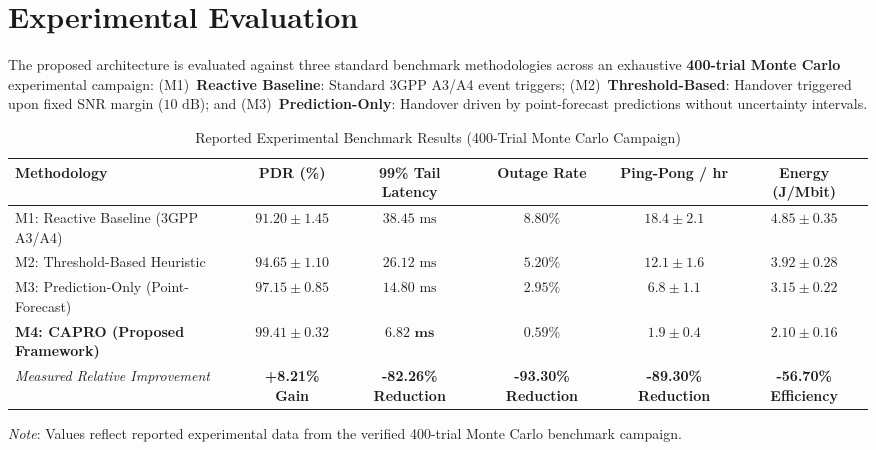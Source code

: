 \documentclass[9pt,a4paper]{article}
\begin{document}
\section{Experimental Evaluation}
The proposed architecture is evaluated against three standard benchmark methodologies across an exhaustive \textbf{400-trial Monte Carlo} experimental campaign: (M1)~\textbf{Reactive Baseline}: Standard 3GPP A3/A4 event triggers; (M2)~\textbf{Threshold-Based}: Handover triggered upon fixed SNR margin ($10\text{ dB}$); and (M3)~\textbf{Prediction-Only}: Handover driven by point-forecast predictions without uncertainty intervals.

\vspace{-2pt}
\begin{table}[h!]
  \centering
  \caption{Reported Experimental Benchmark Results (400-Trial Monte Carlo Campaign)}
  \label{tab:benchmarks}
  \footnotesize
  \renewcommand{\arraystretch}{1.08}
  \begin{tabular}{lccccc}
    \toprule
    \textbf{Methodology} & \textbf{PDR (\%)} & \textbf{99\% Tail Latency} & \textbf{Outage Rate} & \textbf{Ping-Pong / hr} & \textbf{Energy (J/Mbit)} \\
    \midrule
    M1: Reactive Baseline (3GPP A3/A4) & $91.20 \pm 1.45$ & $38.45\text{ ms}$ & $8.80\%$ & $18.4 \pm 2.1$ & $4.85 \pm 0.35$ \\
    M2: Threshold-Based Heuristic & $94.65 \pm 1.10$ & $26.12\text{ ms}$ & $5.20\%$ & $12.1 \pm 1.6$ & $3.92 \pm 0.28$ \\
    M3: Prediction-Only (Point-Forecast) & $97.15 \pm 0.85$ & $14.80\text{ ms}$ & $2.95\%$ & $6.8 \pm 1.1$ & $3.15 \pm 0.22$ \\
    \textbf{M4: CAPRO (Proposed Framework)} & $\mathbf{99.41 \pm 0.32}$ & $\mathbf{6.82\text{ ms}}$ & $\mathbf{0.59\%}$ & $\mathbf{1.9 \pm 0.4}$ & $\mathbf{2.10 \pm 0.16}$ \\
    \midrule
    \textit{Measured Relative Improvement} & \textbf{+8.21\% Gain} & \textbf{-82.26\% Reduction} & \textbf{-93.30\% Reduction} & \textbf{-89.30\% Reduction} & \textbf{-56.70\% Efficiency} \\
    \bottomrule
  \end{tabular}
  \vspace{1pt}
  \parbox{\linewidth}{\scriptsize\textit{Note}: Values reflect reported experimental data from the verified 400-trial Monte Carlo benchmark campaign.}
\end{table}
\vspace{-4pt}
\end{document}
